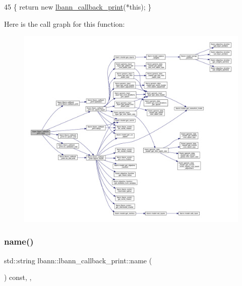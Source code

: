 \begin{DoxyCode}
45 \{ \textcolor{keywordflow}{return} \textcolor{keyword}{new} \hyperlink{classlbann_1_1lbann__callback__print_ac31f404ac68a2cb24cd3d544d128f1d9}{lbann\_callback\_print}(*\textcolor{keyword}{this}); \}
\end{DoxyCode}
Here is the call graph for this function\+:\nopagebreak
\begin{figure}[H]
\begin{center}
\leavevmode
\includegraphics[width=350pt]{classlbann_1_1lbann__callback__print_aa75e076c3d840a2186825be2e8dbac8c_cgraph}
\end{center}
\end{figure}
\mbox{\label{classlbann_1_1lbann__callback__print_a212640539d73eec3317572150a11b71b}} 
\subsubsection{\texorpdfstring{name()}{name()}}
{\footnotesize\ttfamily std\+::string lbann\+::lbann\+\_\+callback\+\_\+print\+::name (\begin{DoxyParamCaption}{ }\end{DoxyParamCaption}) const\hspace{0.3cm}{\ttfamily [inline]}, {\ttfamily [override]}, {\ttfamily [virtual]}}

